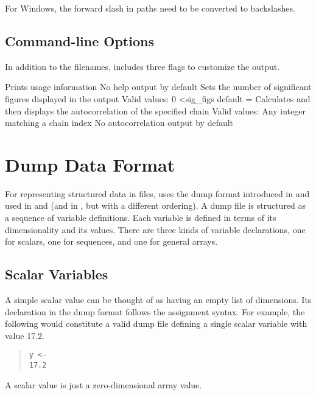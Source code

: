 For Windows, the forward slash in paths need to be converted to backslashes.

\section{Command-line Options}

In addition to the filenames,  includes three flags to customize the output.  

\begin{description}
{Prints usage information}
{No help output by default}
%
{Sets the number of significant figures displayed in the output}
{Valid values: 0 \textless sig\_figs}
{default =  }
%
{Calculates and then displays the autocorrelation of the specified chain}
{Valid values: Any integer matching a chain index}
{No autocorrelation output by default}
%
\end{description}

\chapter{Dump Data Format}\label{dump.chapter}

\noindent 
For representing structured data in files, \Stan uses the dump format
introduced in \SPLUS and used in \R and \JAGS (and in \BUGS, but with
a different ordering).   A dump file is structured as a sequence of
variable definitions.  Each variable is defined in terms of its
dimensionality and its values.   There are three kinds of variable
declarations, one for scalars, one for sequences, and one for general
arrays.

\section{Scalar Variables}

A simple scalar value can be thought of as having an empty list of
dimensions.  Its declaration in the dump format follows the \SPLUS
assignment syntax.  For example, the following would constitute a
valid dump file defining a single scalar variable  with value
17.2.
%
\begin{quote}
\begin{Verbatim}[fontsize=\small]
y <- 
17.2
\end{Verbatim}
\end{quote}
%
A scalar value is just a zero-dimensional array value.

